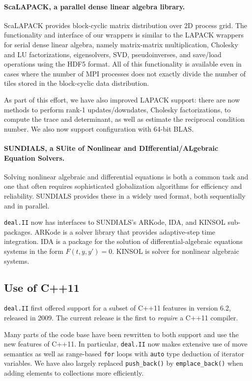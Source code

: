\documentclass{ansarticle-preprint}
\newcommand{\specialword}[1]{\texttt{#1}}
\newcommand{\dealii}{{\specialword{deal.II}}\xspace}
\begin{document}
\paragraph*{ScaLAPACK, a parallel dense linear algebra library.}
  ScaLAPACK \cite{slug} provides block-cyclic matrix distribution over 2D
  process grid. The functionality and interface of our wrappers is similar
  to the LAPACK wrappers for serial dense linear algebra, namely
  matrix-matrix multiplication, Cholesky and LU factorizations,
  eigensolvers, SVD, pseudoinverses, and save/load operations using
  the HDF5 format. All of this functionality is available even in
  cases where the number of MPI processes does not exactly divide the
  number of tiles stored in the block-cyclic data distribution.

  As part of this effort, we have also improved LAPACK support: there
  are now methods to perform rank-1 updates/downdates, Cholesky
  factorizations, to compute the trace and determinant, as well as
  estimate the reciprocal condition number. We also now support
  configuration with 64-bit BLAS.

\paragraph*{SUNDIALS, a SUite of Nonlinear and DIfferential/ALgebraic
  Equation Solvers.}
  Solving nonlinear algebraic and differential equations is both a
  common task and one that often requires sophisticated globalization
  algorithms for efficiency and reliability. SUNDIALS \cite{sundials}
  provides these in a widely used format, both sequentially and in parallel.

  \dealii now has interfaces to SUNDIALS's ARKode, IDA, and KINSOL sub-packages.
  ARKode is a solver library that provides adaptive-step time
  integration. IDA is a package for the solution of differential-algebraic
  equations systems in the form $F(t,y,y')=0$. KINSOL is solver for nonlinear
  algebraic systems.

  \subsection{Use of C++11}
  \label{sec:cxx11}
\dealii first offered support for a subset of C++11 features in
version 6.2, released in 2009. The current release is the first to
\emph{require} a C++11 compiler.

Many parts of the code base have been rewritten to both support and
use the new features of C++11. In particular, \dealii now makes
extensive use of move semantics as well as range-based \texttt{for}
loops with \texttt{auto} type deduction of iterator variables. We have
also largely replaced \texttt{push\_back()} by
\texttt{emplace\_back()} when adding elements to collections more
efficiently.
\end{document}
